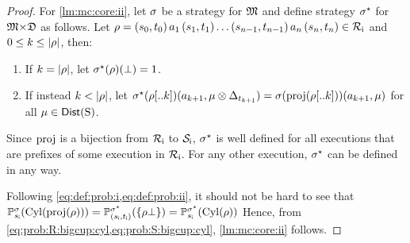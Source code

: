 \begin{proof}
  For \cref{lm:mc:core:ii}, let $\sigma$ be a strategy for
  ${\mathfrak{M}}$ and define strategy $\sigma^\star$ for
  ${\mathfrak{M}}{\times}{\mathfrak{D}}$ as follows.
  Let
  $\rho=(s_0,t_0)\, a_1\, (s_1,t_1)\ldots (s_{n-1},t_{n-1})\, a_n\, (s_n,t_n)\in\mathcal{R}_{\mathsf{i}}$
  and $0\leq k\leq{|}{\rho}{|}$, then:
  \begin{enumerate}
  \item%
    If $k={|}{\rho}{|}$, let $\sigma^\star(\rho)(\bot)=1$.
  \item%
    If instead $k<{|}{\rho}{|}$, let
    $\sigma^\star(\rho[..k])(a_{k+1},\mu\otimes\Delta_{t_{k+1}})=\sigma(\mathrm{proj}(\rho[..k]))(a_{k+1},\mu)$
    for all $\mu\in\mathsf{Dist}(\operatorname{S})$.
  \end{enumerate}
  Since $\mathrm{proj}$ is a bijection from $\mathcal{R}_{\mathsf{i}}$ to $\mathcal{S}_{\mathsf{i}}$, 
  $\sigma^\star$ is well defined for all executions that are prefixes of
  some execution in $\mathcal{R}_{\mathsf{i}}$.
  For any other execution, $\sigma^\star$ can be defined in any way.

  Following \cref{eq:def:prob:i,eq:def:prob:ii}, it should not be hard
  to see that
  $\mathbb{P}^{\sigma}_{{s_{\textsf{i}}}}(\mathrm{Cyl}(\mathrm{proj}(\rho))) =
  \mathbb{P}^{\sigma^\star}_{({s_{\textsf{i}}},{t_{\textsf{i}}})}(\{\rho\bot\}) =
  \mathbb{P}^{\sigma^\star}_{{s_{\textsf{i}}}}(\mathrm{Cyl}(\rho))$
  Hence, from \cref{eq:prob:R:bigcup:cyl,eq:prob:S:bigcup:cyl},
  \cref{lm:mc:core:ii} follows.
\end{proof}
